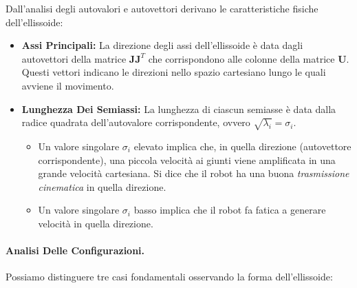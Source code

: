 ﻿\documentclass[11pt, a4paper]{article}
\begin{document}
Dall'analisi degli autovalori e autovettori derivano le caratteristiche fisiche dell'ellissoide:

\begin{itemize}
    \item \textbf{Assi Principali:} La direzione degli assi dell'ellissoide è data dagli autovettori della matrice $\bm{J}\bm{J}^T$ che corrispondono alle colonne della matrice $\bm{U}$. Questi vettori indicano le direzioni nello spazio cartesiano lungo le quali avviene il movimento.

    \item \textbf{Lunghezza Dei Semiassi:} La lunghezza di ciascun semiasse è data dalla radice quadrata dell'autovalore corrispondente, ovvero $\sqrt{\lambda_i} = \sigma_i$.
    \begin{itemize}
        \item Un valore singolare $\sigma_i$ elevato implica che, in quella direzione (autovettore corrispondente), una piccola velocità ai giunti viene amplificata in una grande velocità cartesiana. Si dice che il robot ha una buona \emph{trasmissione cinematica} in quella direzione.
        \item Un valore singolare $\sigma_i$ basso implica che il robot fa fatica a generare velocità in quella direzione.
    \end{itemize}
\end{itemize}

\paragraph{Analisi Delle Configurazioni.}
Possiamo distinguere tre casi fondamentali osservando la forma dell'ellissoide:
\end{document}
